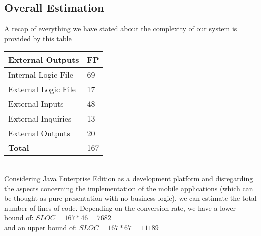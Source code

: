 \subsection{Overall Estimation}
A recap of everything we have stated about the complexity of our system is provided by this table\\
\begin{tabular}{|l|l|}
\hline
\textbf{External Outputs} & \textbf{FP} \\
\hline

Internal Logic File & 69\\
External Logic File & 17\\
External Inputs & 48\\
External Inquiries & 13\\
External Outputs & 20\\
\hline
\textbf{Total} & 167\\
\hline
\end{tabular}
\\
Considering Java Enterprise Edition as a development platform and disregarding the aspects concerning the implementation of the mobile applications (which can be thought as pure presentation with no business logic), we can estimate the total number of lines of code. Depending on the conversion rate, we have a lower bound of: 
$ SLOC = 167 * 46 = 7 682$\\
and an upper bound of:
$ SLOC = 167 * 67 = 11 189$\\